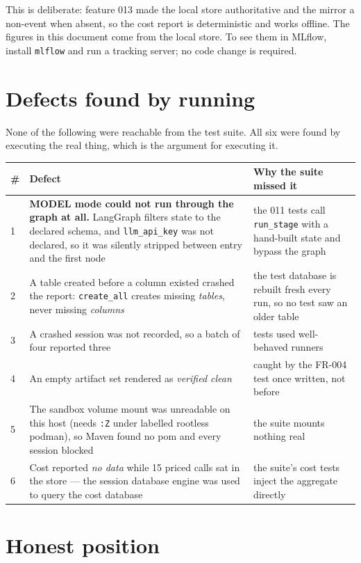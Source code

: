 \documentclass[11pt,a4paper]{article}
\begin{document}
This is deliberate: feature 013 made the local store authoritative and the mirror
a non-event when absent, so the cost report is deterministic and works offline. The
figures in this document come from the local store. To see them in MLflow, install
\texttt{mlflow} and run a tracking server; no code change is required.

\section{Defects found by running}

None of the following were reachable from the test suite. All six were found by
executing the real thing, which is the argument for executing it.

\begin{longtable}{@{}p{}p{}p{}@{}}
\toprule
\textbf{\#} & \textbf{Defect} & \textbf{Why the suite missed it} \\
\midrule
\endhead
1 & \textbf{MODEL mode could not run through the graph at all.} LangGraph filters
state to the declared schema, and \texttt{llm\_api\_key} was not declared, so it
was silently stripped between entry and the first node & the 011 tests call
\texttt{run\_stage} with a hand-built state and bypass the graph \\
2 & A table created before a column existed crashed the report:
\texttt{create\_all} creates missing \emph{tables}, never missing \emph{columns} &
the test database is rebuilt fresh every run, so no test saw an older table \\
3 & A crashed session was not recorded, so a batch of four reported three &
tests used well-behaved runners \\
4 & An empty artifact set rendered as \emph{verified clean} & caught by the FR-004
test once written, not before \\
5 & The sandbox volume mount was unreadable on this host (needs \texttt{:Z} under
labelled rootless podman), so Maven found no pom and every session blocked & the
suite mounts nothing real \\
6 & Cost reported \emph{no data} while 15 priced calls sat in the store --- the
session database engine was used to query the cost database & the suite's cost
tests inject the aggregate directly \\
\bottomrule
\end{longtable}

\section{Honest position}
\end{document}
